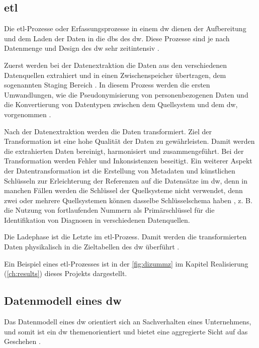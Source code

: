 \subsection{\acs{etl}} \label{subsec:etl} 

Die \acf{etl}-Prozesse oder Erfassungsprozesse in einem \ac{dw} dienen der Aufbereitung und dem Laden der Daten in die \acp{db} des \ac{dw}. Diese Prozesse sind je nach Datenmenge und Design des \ac{dw} sehr zeitintensiv \cite{dwbauer, dwtool}.

Zuerst werden bei der Datenextraktion die Daten aus den verschiedenen Datenquellen extrahiert und in einen Zwischenspeicher übertragen, dem sogenannten Staging Bereich \cite{dwtool}. In diesem Prozess werden die ersten Umwandlungen, wie die Pseudonymisierung von personenbezogenen Daten und die Konvertierung von Datentypen zwischen dem Quellsystem und dem \ac{dw}, vorgenommen \cite{dwbauer}.

Nach der Datenextraktion werden die Daten transformiert. Ziel der Transformation ist eine hohe Qualität der Daten zu gewährleisten. Damit werden die extrahierten Daten bereinigt, harmonisiert und zusammengeführt. Bei der Transformation werden Fehler und Inkonsistenzen beseitigt. Ein weiterer Aspekt der Datentransformation ist die Erstellung von Metadaten und künstlichen Schlüsseln zur Erleichterung der Referenzen auf die Datensätze im \ac{dw}, denn in manchen Fällen werden die Schlüssel der Quellsysteme nicht verwendet, denn zwei oder mehrere Quellsystemen können dasselbe Schlüsselschema haben \cite{dwbauer, dwtool}, z. B. die Nutzung von fortlaufenden Nummern als Primärschlüssel für die Identifikation von Diagnosen in verschiedenen Datenquellen.

Die Ladephase ist die Letzte im \ac{etl}-Prozess. Damit werden die transformierten Daten physikalisch in die Zieltabellen des \ac{dw} überführt \cite{dwgoeken, dwtool}.

Ein Beispiel eines \ac{etl}-Prozesses ist in der \ref{fig:dizummz} im Kapitel \glqq Realisierung\grqq{} (\ref{ch:results}) dieses Projekts dargestellt.

\subsection{Datenmodell eines \acs{dw}} \label{subsec:datamodel}

Das Datenmodell eines \ac{dw} orientiert sich an Sachverhalten eines Unternehmens, und somit ist ein \ac{dw} themenorientiert und bietet eine aggregierte Sicht auf das Geschehen \cite{dwgoeken}.

